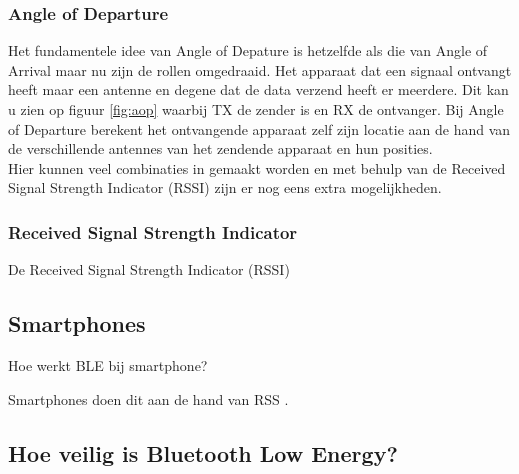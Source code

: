 \subsubsection{Angle of Departure}

Het fundamentele idee van Angle of Depature is hetzelfde als die van Angle of Arrival maar nu zijn de rollen omgedraaid. Het apparaat dat een signaal ontvangt heeft maar een antenne en degene dat de data verzend heeft er meerdere. Dit kan u zien op figuur \ref{fig:aop} waarbij TX de zender is en RX de ontvanger. Bij Angle of Departure berekent het ontvangende apparaat zelf zijn locatie aan de hand van de verschillende antennes van het zendende apparaat en hun posities.\\

Hier kunnen veel combinaties in gemaakt worden en met behulp van de Received Signal Strength Indicator (RSSI) zijn er nog eens extra mogelijkheden.


\subsubsection{Received Signal Strength Indicator}

De Received Signal Strength Indicator (RSSI)

\subsection{Smartphones}

Hoe werkt BLE bij smartphone?

Smartphones doen dit aan de hand van RSS \autocite{Chen2017}.


\subsection{Hoe veilig is Bluetooth Low Energy?}
